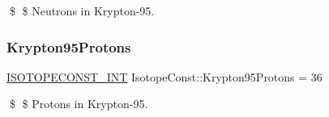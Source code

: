 \$ \$ Neutrons in Krypton-\/95. \mbox{\label{group___isotope_const-_krypton-_kr95_ga92a6bd1442970f1dbf518e0395bd6f24}} 
\subsubsection{\texorpdfstring{Krypton95\+Protons}{Krypton95Protons}}
{\footnotesize\ttfamily \mbox{\hyperlink{group___isotope_const-_macros_ga5f18360b3e99483a35c32d789e62621c}{I\+S\+O\+T\+O\+P\+E\+C\+O\+N\+S\+T\+\_\+\+I\+NT}} Isotope\+Const\+::\+Krypton95\+Protons = 36}

\$ \$ Protons in Krypton-\/95. 